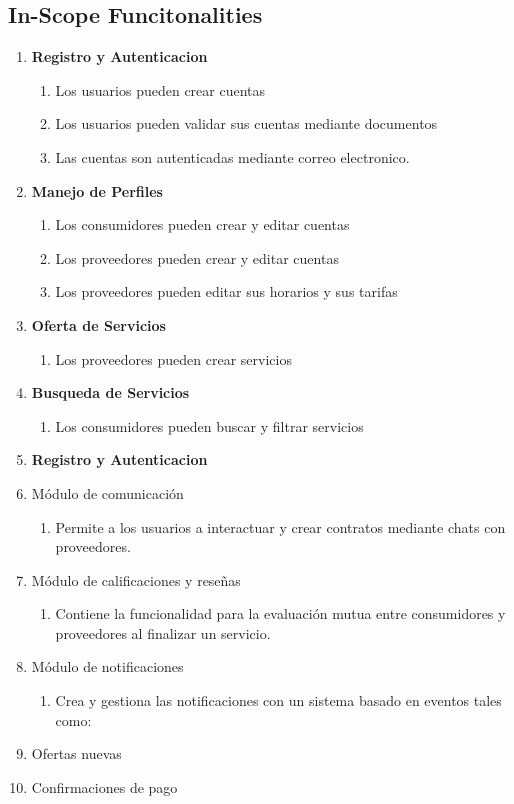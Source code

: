 \documentclass{article}
\begin{document}
  \subsection{In-Scope Funcitonalities}
    \begin{enumerate}
      \item \textbf{Registro y Autenticacion}
        \begin{enumerate}
          \item Los usuarios pueden crear cuentas
          \item Los usuarios pueden validar sus cuentas mediante documentos
          \item Las cuentas son autenticadas mediante correo electronico.
        \end{enumerate}
      \item \textbf{Manejo de Perfiles}
        \begin{enumerate}
          \item Los consumidores pueden crear y editar cuentas
          \item Los proveedores pueden crear  y editar cuentas
          \item Los proveedores pueden editar sus horarios y sus tarifas
        \end{enumerate}
      \item \textbf{Oferta de Servicios}
        \begin{enumerate}
          \item Los proveedores pueden crear servicios
        \end{enumerate}
      \item \textbf{Busqueda de Servicios}
        \begin{enumerate}
          \item Los consumidores pueden buscar y filtrar servicios
        \end{enumerate}
      \item \textbf{Registro y Autenticacion}
      \item Módulo de comunicación  
        \begin{enumerate}
          \item Permite a los usuarios a interactuar y crear contratos mediante chats con proveedores. 
        \end{enumerate}
      \item Módulo de calificaciones y reseñas   
        \begin{enumerate} 
          \item Contiene la funcionalidad para la evaluación mutua entre consumidores y proveedores al finalizar un servicio.  
        \end{enumerate} 
      \item Módulo de notificaciones  
      \begin{enumerate} \item Crea y gestiona las notificaciones con un sistema basado en eventos tales como: \end{enumerate} 

      \item Ofertas nuevas 
      \item Confirmaciones de pago 
    \end{enumerate}
\end{document}
